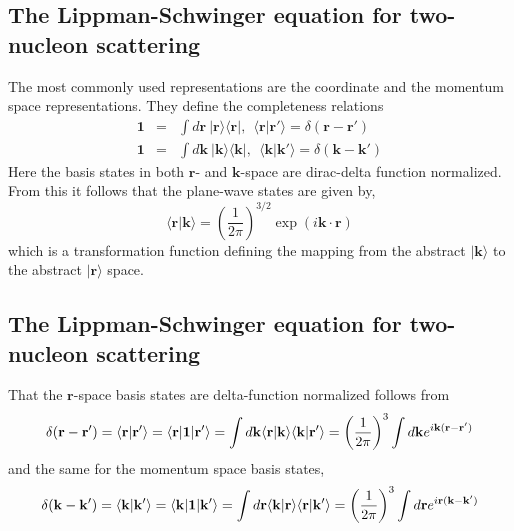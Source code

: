 \documentclass[%
twoside,                 %
final,                   %
10pt]{article}
\begin{document}
\subsection{The Lippman-Schwinger equation for two-nucleon scattering}
\begin{block}{}
The most commonly used representations are the coordinate and
the momentum space representations. They define the completeness relations 
\begin{eqnarray*}
 \mathbf{1}&=&  \int d\mathbf{r} \:\vert\mathbf{r} \rangle \langle \mathbf{r}\vert, \:\: \langle  \mathbf{r}\vert  \mathbf{r'} \rangle = \delta ( \mathbf{r}-\mathbf{r'}) \\
\mathbf{1} &=& \int d\mathbf{k} \:\vert  \mathbf{k}\rangle \langle \mathbf{k}\vert, \:\: \langle\mathbf{k}\vert  \mathbf{k'} \rangle = \delta ( \mathbf{k}-\mathbf{k'}) 
\end{eqnarray*}
Here the basis states in  both $\mathbf{r}$- and $\mathbf{k}$-space are dirac-delta 
function normalized. From this it follows that the plane-wave states are given by,
\[
\langle\mathbf{r}\vert\mathbf{k} \rangle =\left(\frac{1}{2\pi}\right)^{3/2}\exp\left(i\mathbf{k\cdot r} \right)
\]
which is a transformation function defining the mapping from the abstract 
$\vert\mathbf{k}\rangle$ to the abstract $\vert\mathbf{r}\rangle $ space.
\end{block}

\subsection{The Lippman-Schwinger equation for two-nucleon scattering}
\begin{block}{}
That the $\mathbf{r}$-space basis states are 
delta-function normalized follows from 
\[
\delta ( \mathbf{r}-\mathbf{r'}) = \langle \mathbf{r} \vert \mathbf{r}'\rangle = \langle \mathbf{r} \vert \mathbf{1} \vert \mathbf{r}'\rangle = \int d\mathbf{k} \langle \mathbf{r}\vert \mathbf{k} \rangle \langle \mathbf{k}\vert \mathbf{r}' \rangle =\left( {1\over 2\pi}\right)^3 \int d\mathbf{k} e^{i \mathbf{k}(\mathbf{r} - \mathbf{r}')} 
\]
and the same for the momentum space basis states,
\[
\delta ( \mathbf{k}-\mathbf{k'}) = \langle \mathbf{k} \vert \mathbf{k}'\rangle = \langle \mathbf{k} \vert \mathbf{1} \vert \mathbf{k}'\rangle =\int d\mathbf{r} \langle \mathbf{k}\vert \mathbf{r} \rangle \langle \mathbf{r}\vert \mathbf{k}' \rangle = \left( {1\over 2\pi}\right)^3 \int d\mathbf{r} e^{i \mathbf{r}(\mathbf{k} - \mathbf{k}')} 
\]
\end{block}
\end{document}
